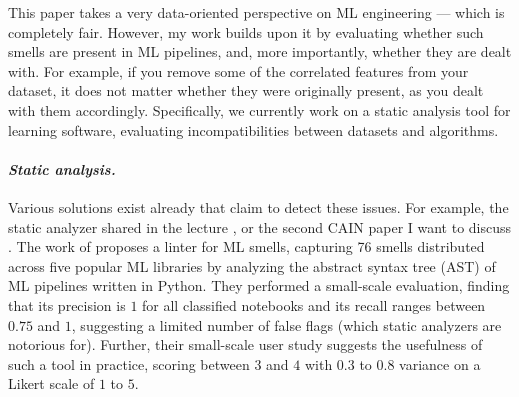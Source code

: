     This paper takes a very data-oriented perspective on ML engineering --- which is completely fair.
    However, my work \citep{meijer_contract_2024} builds upon it by evaluating whether such smells are present in ML pipelines, and, more importantly, whether they are dealt with.
    For example, if you remove some of the correlated features from your dataset, it does not matter whether they were originally present, as you dealt with them accordingly.
    Specifically, we currently work on a static analysis tool for learning software, evaluating incompatibilities between datasets and algorithms.

    \paragraph{\textit{Static analysis.}} Various solutions exist already that claim to detect these issues.
    For example, the static analyzer shared in the lecture \citep{quaranta2024pynblint}, or the second CAIN paper I want to discuss \citep{shivashankar2025mlscent}.
    The work of \citet{shivashankar2025mlscent} proposes a linter for ML smells, capturing 76 smells distributed across five popular ML libraries by analyzing the abstract syntax tree (AST) of ML pipelines written in Python.
    They performed a small-scale evaluation, finding that its precision is $1$ for all classified notebooks and its recall ranges between $0.75$ and $1$, suggesting a limited number of false flags (which static analyzers are notorious for).
    Further, their small-scale user study suggests the usefulness of such a tool in practice, scoring between $3$ and $4$ with $0.3$ to $0.8$ variance on a Likert scale of $1$ to $5$.
    
